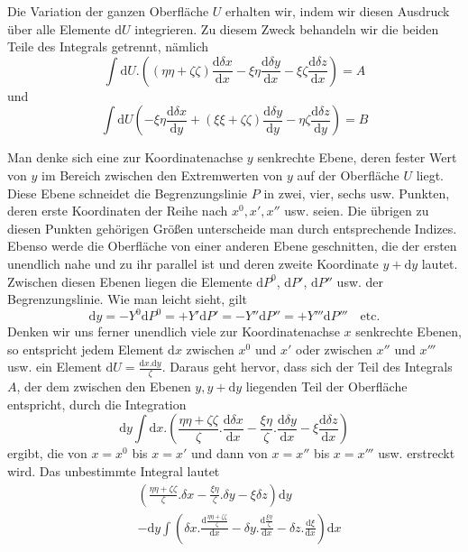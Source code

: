 Die Variation der ganzen Oberfläche $U$ erhalten wir, indem wir diesen Ausdruck über alle Elemente $\mathrm{d}U$ integrieren. Zu diesem Zweck behandeln wir die beiden Teile des Integrals getrennt, nämlich
\[
\int\mathrm{d}U.((\eta\eta+\zeta\zeta)\frac{\mathrm{d}\delta x}{\mathrm{d}x}-\xi\eta\frac{\mathrm{d}\delta y}{\mathrm{d}x}-\xi\zeta\frac{\mathrm{d}\delta z}{\mathrm{d}x})=A
\]
und
\[
\int\mathrm{d}U(-\xi\eta\frac{\mathrm{d}\delta x}{\mathrm{d}y}+(\xi\xi+\zeta\zeta)\frac{\mathrm{d}\delta y}{\mathrm{d}y}-\eta\zeta\frac{\mathrm{d}\delta z}{\mathrm{d}y})=B
\]

Man denke sich eine zur Koordinatenachse $y$ senkrechte Ebene, deren fester Wert von $y$ im Bereich zwischen den Extremwerten von $y$ auf der Oberfläche $U$ liegt. Diese Ebene schneidet die Begrenzungslinie $P$ in zwei, vier, sechs usw. Punkten, deren erste Koordinaten der Reihe nach $x^0,x',x''$ usw. seien. Die übrigen zu diesen Punkten gehörigen Größen unterscheide man durch entsprechende Indizes. Ebenso werde die Oberfläche von einer anderen Ebene geschnitten, die der ersten unendlich nahe und zu ihr parallel ist und deren zweite Koordinate $y+\mathrm{d}y$ lautet. Zwischen diesen Ebenen liegen die Elemente $\mathrm{d}P^0$, $\mathrm{d}P'$, $\mathrm{d}P''$ usw. der Begrenzungslinie. Wie man leicht sieht, gilt
\[
\mathrm{d}y=-Y^0\mathrm{d}P^0=+Y'\mathrm{d}P'=-Y''\mathrm{d}P''=+Y'''\mathrm{d}P'''\quad\text{etc.}
\]
Denken wir uns ferner unendlich viele zur Koordinatenachse $x$ senkrechte Ebenen, so entspricht jedem Element $\mathrm{d}x$ zwischen $x^0$ und $x'$ oder zwischen $x''$ und $x'''$ usw. ein Element $\mathrm{d}U=\frac{\mathrm{d}x.\mathrm{d}y}{\zeta}$. Daraus geht hervor, dass sich der Teil des Integrals $A$, der dem zwischen den Ebenen $y,y+\mathrm{d}y$ liegenden Teil der Oberfläche entspricht, durch die Integration
\[
\mathrm{d}y\int\mathrm{d}x.(\frac{\eta\eta+\zeta\zeta}{\zeta}.\frac{\mathrm{d}\delta x}{\mathrm{d}x}-\frac{\xi\eta}{\zeta}.\frac{\mathrm{d}\delta y}{\mathrm{d}x}-\xi\frac{\mathrm{d}\delta z}{\mathrm{d}x})
\]
ergibt, die von $x=x^0$ bis $x=x'$ und dann von $x=x''$ bis $x=x'''$ usw. erstreckt wird. Das unbestimmte Integral lautet
\[
\begin{aligned}
&(\frac{\eta\eta+\zeta\zeta}{\zeta}.\delta x-\frac{\xi\eta}{\zeta}.\delta y-\xi\delta z)\mathrm{d}y\\
&-\mathrm{d}y\int(\delta x.\frac{\mathrm{d}\frac{\eta\eta+\zeta\zeta}{\zeta}}{\mathrm{d}x}-\delta y.\frac{\mathrm{d}\frac{\xi\eta}{\zeta}}{\mathrm{d}x}-\delta z.\frac{\mathrm{d}\xi}{\mathrm{d}x})\mathrm{d}x
\end{aligned}
\]
